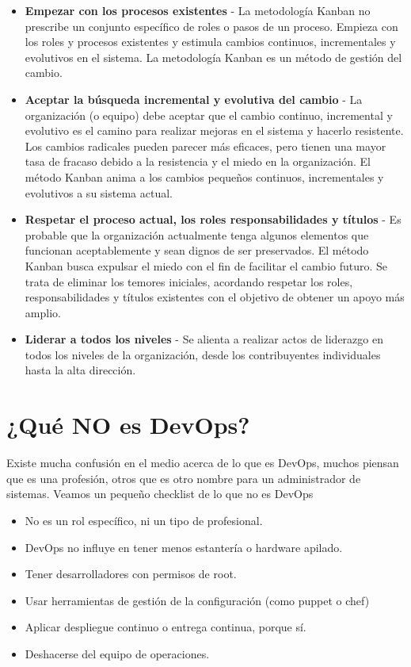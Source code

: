 \documentclass[conference]{IEEEtran}
\begin{document}
\begin{itemize}
 \item {\bf Empezar con los procesos existentes} - La metodología Kanban no prescribe un conjunto específico de roles o pasos de un proceso. Empieza con los roles y procesos existentes  y estimula cambios continuos, incrementales y evolutivos en el sistema. La metodología Kanban es un método de gestión del cambio.
 \item {\bf Aceptar la búsqueda incremental y evolutiva del cambio} - La organización (o equipo) debe aceptar que el cambio continuo, incremental y evolutivo es el camino para realizar mejoras en el sistema y hacerlo resistente. Los cambios radicales pueden parecer más eficaces, pero tienen una mayor tasa de fracaso debido a la resistencia y el miedo en la organización. El método Kanban anima a los cambios pequeños continuos, incrementales y evolutivos a su sistema actual.
 \item {\bf Respetar el proceso actual, los roles responsabilidades y títulos} - Es probable que la organización actualmente tenga algunos elementos que funcionan aceptablemente y sean dignos de ser preservados. El método Kanban busca expulsar el miedo con el fin de facilitar el cambio futuro. Se trata de eliminar los temores iniciales, acordando respetar los roles, responsabilidades y títulos existentes con el objetivo de obtener un apoyo más amplio.
 \item {\bf Liderar a todos los niveles} - Se alienta a realizar actos de liderazgo en todos los niveles de la organización, desde los contribuyentes individuales hasta la alta dirección.
\end{itemize}

\section{¿Qué NO es DevOps?}

Existe mucha confusión en el medio acerca de lo que es DevOps, muchos piensan que es una profesión, otros que es otro nombre para un administrador de sistemas. Veamos un pequeño checklist de lo que no es DevOps

\begin{itemize}
 \item No es un rol específico, ni un tipo de profesional.
 \item DevOps no influye en tener menos estantería o hardware apilado.
 \item Tener desarrolladores con permisos de root.
 \item Usar herramientas de gestión de la configuración (como puppet o chef)
 \item Aplicar despliegue continuo o entrega continua, porque sí.
 \item Deshacerse del equipo de operaciones.
\end{itemize}
\end{document}
